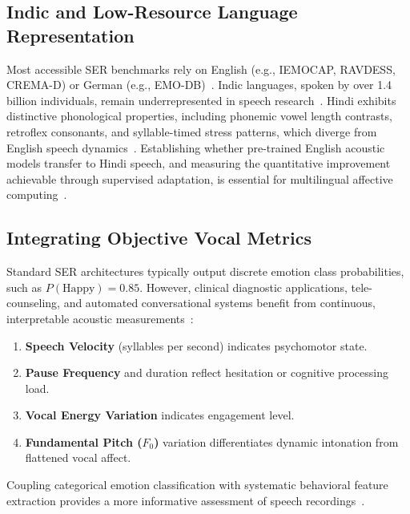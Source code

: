 \documentclass[10pt,journal,compsoc]{IEEEtran}
\begin{document}
\subsection{Indic and Low-Resource Language Representation}
Most accessible SER benchmarks rely on English (e.g., IEMOCAP, RAVDESS, CREMA-D) or German (e.g., EMO-DB)~\cite{akcay2020speech, busso2008iemocap}. Indic languages, spoken by over 1.4 billion individuals, remain underrepresented in speech research~\cite{kotian2026evaluating, chauhan2023mnitj}. Hindi exhibits distinctive phonological properties, including phonemic vowel length contrasts, retroflex consonants, and syllable-timed stress patterns, which diverge from English speech dynamics~\cite{kotian2026benchmarking, mehra2022beris}. Establishing whether pre-trained English acoustic models transfer to Hindi speech, and measuring the quantitative improvement achievable through supervised adaptation, is essential for multilingual affective computing~\cite{kotian2026evaluating, livingstone2018ravdess}.

\subsection{Integrating Objective Vocal Metrics}
Standard SER architectures typically output discrete emotion class probabilities, such as $P(\text{Happy}) = 0.85$. However, clinical diagnostic applications, tele-counseling, and automated conversational systems benefit from continuous, interpretable acoustic measurements~\cite{kawade2024indian, chowdhury2025speech}:
\begin{enumerate}
    \item \textbf{Speech Velocity} (syllables per second) indicates psychomotor state.
    \item \textbf{Pause Frequency} and duration reflect hesitation or cognitive processing load.
    \item \textbf{Vocal Energy Variation} indicates engagement level.
    \item \textbf{Fundamental Pitch ($F_0$)} variation differentiates dynamic intonation from flattened vocal affect.
\end{enumerate}
Coupling categorical emotion classification with systematic behavioral feature extraction provides a more informative assessment of speech recordings~\cite{kotian2026evaluating, chowdhury2025speech}.
\end{document}
